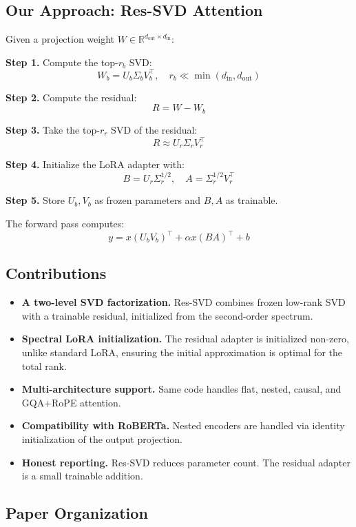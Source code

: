 \subsection{Our Approach: Res-SVD Attention}

Given a projection weight $W \in \mathbb{R}^{d_\text{out} \times d_\text{in}}$:

\textbf{Step 1.} Compute the top-$r_b$ SVD:
\[
W_b = U_b \Sigma_b V_b^\top, \quad r_b \ll \min(d_\text{in}, d_\text{out})
\tag{1.2}
\]

\textbf{Step 2.} Compute the residual:
\[
R = W - W_b
\tag{1.3}
\]

\textbf{Step 3.} Take the top-$r_r$ SVD of the residual:
\[
R \approx U_r \Sigma_r V_r^\top
\tag{1.4}
\]

\textbf{Step 4.} Initialize the LoRA adapter with:
\[
B = U_r \Sigma_r^{1/2}, \quad A = \Sigma_r^{1/2} V_r^\top
\tag{1.5}
\]

\textbf{Step 5.} Store $U_b, V_b$ as frozen parameters and $B, A$ as trainable.

The forward pass computes:
\[
y = x (U_b V_b)^\top + \alpha x (B A)^\top + b
\tag{1.6}
\]

\subsection{Contributions}

\begin{itemize}
\item \textbf{A two-level SVD factorization.} Res-SVD combines frozen low-rank SVD
  with a trainable residual, initialized from the second-order spectrum.
\item \textbf{Spectral LoRA initialization.} The residual adapter is initialized
  non-zero, unlike standard LoRA, ensuring the initial approximation is
  optimal for the total rank.
\item \textbf{Multi-architecture support.} Same code handles flat, nested, causal,
  and GQA+RoPE attention.
\item \textbf{Compatibility with RoBERTa.} Nested encoders are handled via
  identity initialization of the output projection.
\item \textbf{Honest reporting.} Res-SVD reduces parameter count. The residual
  adapter is a small trainable addition.

\end{itemize}
\subsection{Paper Organization}

